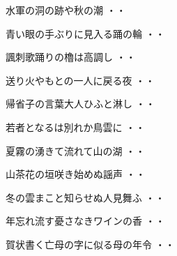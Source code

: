 \begin{shiika}水軍の洞の跡や秋の潮
\hfill{・・}\end{shiika}
\vspace{0.6cm}
\begin{shiika}青い眼の手ぶりに見入る踊の輪
\hfill{・・}\end{shiika}
\vspace{0.6cm}
\begin{shiika}諷刺歌踊りの櫓は高調し
\hfill{・・}\end{shiika}
\vspace{0.6cm}
\begin{shiika}送り火やもとの一人に戻る夜
\hfill{・・}\end{shiika}
\vspace{0.6cm}
\begin{shiika}帰省子の言葉大人ひふと淋し
\hfill{・・}\end{shiika}
\vspace{0.6cm}
\begin{shiika}若者となるは別れか鳥雲に
\hfill{・・}\end{shiika}
\vspace{0.6cm}
\begin{shiika}夏霧の湧きて流れて山の湖
\hfill{・・}\end{shiika}
\vspace{0.6cm}
\begin{shiika}山茶花の垣咲き始めぬ謡声
\hfill{・・}\end{shiika}
\vspace{0.6cm}
\begin{shiika}冬の雲まこと知らせぬ人見舞ふ
\hfill{・・}\end{shiika}
\vspace{0.6cm}
\begin{shiika}年忘れ流す憂さなきワインの香
\hfill{・・}\end{shiika}
\vspace{0.6cm}
\begin{shiika}賀状書く亡母の字に似る母の年令
\hfill{・・}\end{shiika}
\vspace{0.6cm}

